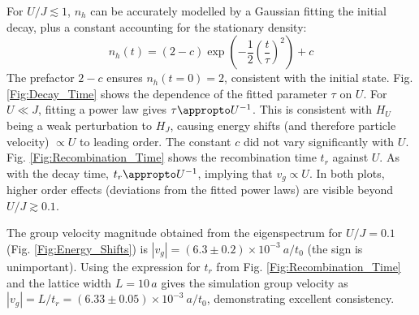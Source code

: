 For $U/J\lesssim1$, $n_{h}$ can be accurately modelled by a Gaussian fitting the initial decay, plus a constant accounting for the stationary density:
\begin{equation}\label{Eq:Gaussian_Fit}
    n_{h}(t) = (2-c)\exp{\left(-\frac{1}{2}\left(\frac{t}{\tau}\right)^2 \right) } + c
\end{equation}
The prefactor $2-c$ ensures $n_{h}(t=0)=2$, consistent with the initial state. Fig. \ref{Fig:Decay_Time} shows the dependence of the fitted parameter $\tau$ on $U$. For $U\ll J$, fitting a power law gives $\tau \appropto U^{-1}$. This is consistent with $H_U$ being a weak perturbation to $H_J$, causing energy shifts (and therefore particle velocity) $\propto U$ to leading order. The constant $c$ did not vary significantly with $U$. Fig. \ref{Fig:Recombination_Time} shows the recombination time $t_r$ against $U$. As with the decay time, $t_r \appropto U^{-1}$, implying that $v_g\propto U$. In both plots, higher order effects (deviations from the fitted power laws) are visible beyond $U/J \gtrsim 0.1$.

The group velocity magnitude obtained from the eigenspectrum for $U/J=0.1$ (Fig. \ref{Fig:Energy_Shifts}) is $|v_g| = (6.3 \pm 0.2)\times 10^{-3}\: a/t_0$ (the sign is unimportant). Using the expression for $t_r$ from Fig. \ref{Fig:Recombination_Time} and the lattice width $L=10\,a$ gives the simulation group velocity as $|v_g| = L/t_r=(6.33 \pm 0.05)\times 10^{-3} \: a/t_0$, demonstrating excellent consistency.


